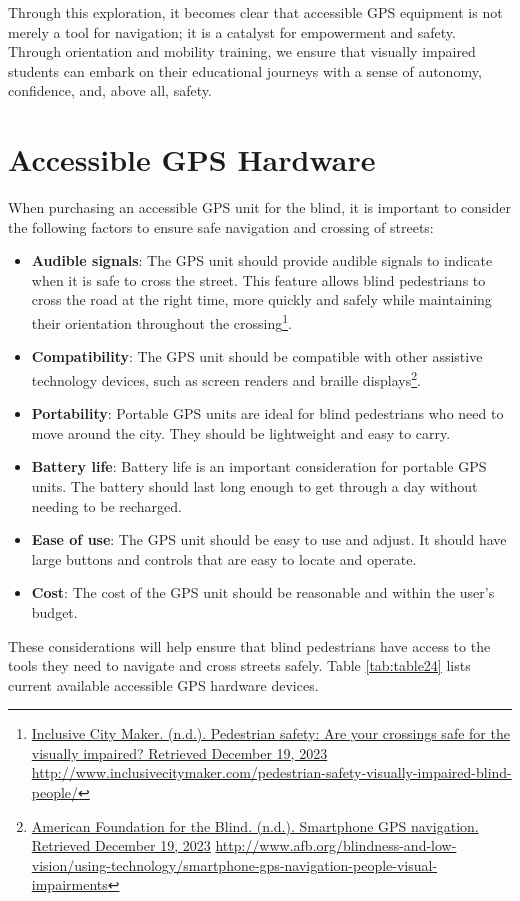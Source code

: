 Through this exploration, it becomes clear that accessible GPS equipment is not merely a tool for navigation; it is a catalyst for empowerment and safety. Through orientation and mobility training, we ensure that visually impaired students can embark on their educational journeys with a sense of autonomy, confidence, and, above all, safety.


\pagebreak \hypertarget{accessible-gps-mapping-hardware}{}\section{Accessible GPS Hardware}\label{accessible-gps-mapping-hardware}
When purchasing an accessible GPS unit for the blind, it is important to consider the following factors to ensure safe navigation and crossing of streets:
\begin{itemize}[leftmargin=*]
\item \textbf{Audible signals}: The GPS unit should provide audible signals to indicate when it is safe to cross the street. This feature allows blind pedestrians to cross the road at the right time, more quickly and safely while maintaining their orientation throughout the crossing\footnote{\raggedright \href{http://www.inclusivecitymaker.com/pedestrian-safety-visually-impaired-blind-people/}{Inclusive City Maker. (n.d.). Pedestrian safety: Are your crossings safe for the visually impaired? Retrieved December 19, 2023} \url{http://www.inclusivecitymaker.com/pedestrian-safety-visually-impaired-blind-people/}}.
\item \textbf{Compatibility}: The GPS unit should be compatible with other assistive technology devices, such as screen readers and braille displays\footnote{\raggedright \href{http://www.afb.org/blindness-and-low-vision/using-technology/smartphone-gps-navigation-people-visual-impairments}{American Foundation for the Blind. (n.d.). Smartphone GPS navigation. Retrieved December 19, 2023} \url{http://www.afb.org/blindness-and-low-vision/using-technology/smartphone-gps-navigation-people-visual-impairments}}.
\item \textbf{Portability}: Portable GPS units are ideal for blind pedestrians who need to move around the city. They should be lightweight and easy to carry.
\item \textbf{Battery life}: Battery life is an important consideration for portable GPS units. The battery should last long enough to get through a day without needing to be recharged.
\item \textbf{Ease of use}: The GPS unit should be easy to use and adjust. It should have large buttons and controls that are easy to locate and operate.
\item \textbf{Cost}: The cost of the GPS unit should be reasonable and within the user’s budget.
\end{itemize}
These considerations will help ensure that blind pedestrians have access to the tools they need to navigate and cross streets safely. Table \ref{tab:table24} lists current available accessible GPS hardware devices.

